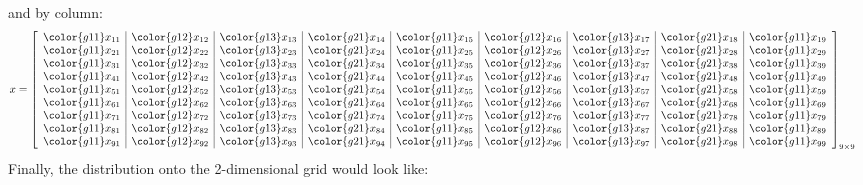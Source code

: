 and by column:
\begin{align*}
x &= \left[
      \begin{array}{l|l|l|l|l|l|l|l|l}
      \color{g11}x_{11} & \color{g12}x_{12} & \color{g13}x_{13} & \color{g21}x_{14} & \color{g11}x_{15} & \color{g12}x_{16} & \color{g13}x_{17} & \color{g21}x_{18} & \color{g11}x_{19}\\
      \color{g11}x_{21} & \color{g12}x_{22} & \color{g13}x_{23} & \color{g21}x_{24} & \color{g11}x_{25} & \color{g12}x_{26} & \color{g13}x_{27} & \color{g21}x_{28} & \color{g11}x_{29}\\
      \color{g11}x_{31} & \color{g12}x_{32} & \color{g13}x_{33} & \color{g21}x_{34} & \color{g11}x_{35} & \color{g12}x_{36} & \color{g13}x_{37} & \color{g21}x_{38} & \color{g11}x_{39}\\
      \color{g11}x_{41} & \color{g12}x_{42} & \color{g13}x_{43} & \color{g21}x_{44} & \color{g11}x_{45} & \color{g12}x_{46} & \color{g13}x_{47} & \color{g21}x_{48} & \color{g11}x_{49}\\
      \color{g11}x_{51} & \color{g12}x_{52} & \color{g13}x_{53} & \color{g21}x_{54} & \color{g11}x_{55} & \color{g12}x_{56} & \color{g13}x_{57} & \color{g21}x_{58} & \color{g11}x_{59}\\
      \color{g11}x_{61} & \color{g12}x_{62} & \color{g13}x_{63} & \color{g21}x_{64} & \color{g11}x_{65} & \color{g12}x_{66} & \color{g13}x_{67} & \color{g21}x_{68} & \color{g11}x_{69}\\
      \color{g11}x_{71} & \color{g12}x_{72} & \color{g13}x_{73} & \color{g21}x_{74} & \color{g11}x_{75} & \color{g12}x_{76} & \color{g13}x_{77} & \color{g21}x_{78} & \color{g11}x_{79}\\
      \color{g11}x_{81} & \color{g12}x_{82} & \color{g13}x_{83} & \color{g21}x_{84} & \color{g11}x_{85} & \color{g12}x_{86} & \color{g13}x_{87} & \color{g21}x_{88} & \color{g11}x_{89}\\
      \color{g11}x_{91} & \color{g12}x_{92} & \color{g13}x_{93} & \color{g21}x_{94} & \color{g11}x_{95} & \color{g12}x_{96} & \color{g13}x_{97} & \color{g21}x_{98} & \color{g11}x_{99}\\
      \end{array}
\right]_{9\times 9}
\end{align*}
Finally, the distribution onto the 2-dimensional grid would look like:

